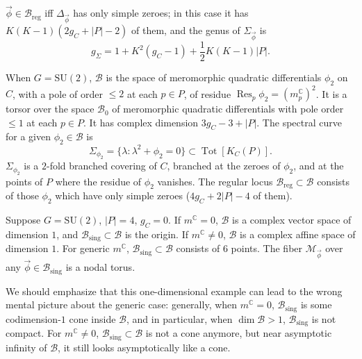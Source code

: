 \documentclass[12pt,letterpaper,reqno]{article}
\numberwithin{equation}{section}
\newcommand{\cB}{\ensuremath{\mathcal B}}
\newcommand{\cM}{\ensuremath{\mathcal M}}
\newcommand{\C}{\ensuremath{\mathbb C}}
\newcommand{\half}{\ensuremath{\frac{1}{2}}}
\newcommand{\sing}{\mathrm{sing}}
\newcommand{\reg}{\mathrm{reg}}
\newcommand{\abs}[1]{\lvert#1\rvert}
\newcommand{\vphi}{{\vec\phi}}
\DeclareMathOperator{\Res}{Res}
\DeclareMathOperator{\Tot}{Tot}
\newcommand{\SU}{\mathrm{SU}}
\newcommand{\insfig}[2]{

\medskip
\noindent
\begin{minipage}{\linewidth}

\makebox[\linewidth]{\texttt{[image: figures/\#1-crop.pdf]}}

\end{minipage}
\medskip

}
\begin{document}
\begin{defn}
$\vphi \in \cB_\reg$ iff $\Delta_\vphi$ has only simple zeroes; in this case
it has $K(K-1)(2g_C+\abs{P}-2)$ of them, and the genus of $\Sigma_\vphi$ is
\begin{equation}
  g_\Sigma = 1 + K^2(g_C - 1) + \half K(K-1) \abs{P}.
\end{equation}


\begin{example}[Hitchin base and spectral curves for $G = \SU(2)$]
When $G = \SU(2)$, $\cB$ is the space of meromorphic quadratic
differentials $\phi_2$ on $C$, with a pole of order $\le 2$ at 
each $p \in P$, of residue $\Res_p \phi_2 = (m_p^\C)^2$.
It is a torsor over the space $\cB_0$ of meromorphic quadratic differentials
with pole order $\le 1$ at each $p \in P$. It has complex dimension
$3 g_C - 3 + \abs{P}$. The spectral curve for a given $\phi_2 \in \cB$
is
\begin{equation}
  \Sigma_{\phi_2} = \{\lambda: \lambda^2 + \phi_2 = 0\} \subset \Tot[K_C(P)].
\end{equation}
$\Sigma_{\phi_2}$ is a $2$-fold branched covering of $C$, branched at the zeroes of $\phi_2$,
and at the points of $P$ where the residue of $\phi_2$ vanishes.
The regular locus $\cB_\reg \subset \cB$ consists of those $\phi_2$ which have only simple zeroes ($4 g_C + 2\abs{P} - 4$ of them).
\end{example}
\end{defn}


\begin{example}
Suppose $G = \SU(2)$, $\abs{P} = 4$, $g_C = 0$.
If $m^\C = 0$, $\cB$ is a complex vector space of dimension $1$,
and $\cB_\sing \subset \cB$ is the origin.
If $m^\C \neq 0$, $\cB$ is a complex affine space of dimension $1$.
For generic $m^\C$, $\cB_\sing \subset \cB$ consists
of $6$ points. The fiber $\cM_\vphi$ over any $\vphi \in \cB_\sing$ is
a nodal torus.
\end{example}

\insfig{higgs-metric-2}{0.85}

We should emphasize that this one-dimensional example can lead to the
wrong mental picture about the generic case: generally,
when $m^\C = 0$, $\cB_\sing$ is some codimension-$1$ cone inside $\cB$, and in particular,
when $\dim \cB > 1$, $\cB_\sing$ is not compact. For $m^\C \neq 0$, $\cB_\sing \subset \cB$
is not a cone anymore, but near asymptotic infinity of $\cB$,
it still looks asymptotically like a cone.


\end{document}
